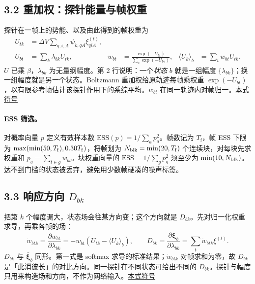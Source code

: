 \documentclass[UTF8,fontset=none,10pt,a4paper]{ctexart}
\newcommand{\X}{\bar{\bm\xi}}
\newcommand{\sd}[1]{\hfill\mbox{\footnotesize\hyperlink{sym:#1}{本式符号}}\par}
\begin{document}
\subsection*{3.2 重加权：探针能量与帧权重}
探针在一帧上的势能、以及由此得到的帧权重为
\begin{equation}\label{e:weight}
 \begin{aligned}
 U_{tk}&=\Delta V\sum_{q,i,A}\psi_{k,qA}\xi^{(t)}_{qiA},\\
 U_{bt}&=\sum_k\lambda_{bk}U_{tk},&
 w_{bt}&=\frac{\exp(-U_{bt})}{\sum_s\exp(-U_{bs})},&
 \langle U_k\rangle_b&=\sum_t w_{bt}U_{tk}.
 \end{aligned}
\end{equation}
$U$ 已乘 $\beta$，$\lambda_{bk}$ 为无量纲幅度。第 2 行说明：一个\emph{状态} $b$ 就是一组幅度 $\{\lambda_{bk}\}$；换一组幅度就是另一个状态。Boltzmann 重加权给原轨迹每帧乘权重 $\exp(-U_{bt})$，以有限参考帧估计该探针作用下的系综平均。$w_{bt}$ 在同一轨迹内对帧归一。\sd{e:weight}

\paragraph{ESS 筛选。} 对概率向量 $p$ 定义有效样本数 $\mathrm{ESS}(p)=1/\sum_a p_a^2$。帧数记为 $T_{\mathrm f}$，帧 ESS 下限为 $\max(\min(50,T_{\rm f}),0.30T_{\rm f})$，将帧划为 $N_{\rm blk}=\min(20,T_{\mathrm f})$ 个连续块，对每块先求权重和 $p_g=\sum_{t\in g}w_{bt}$。块权重向量的 $\mathrm{ESS}=1/\sum_g p_g^2$ 须至少为 $\min(10,N_{\rm blk})$。达不到门槛的状态被丢弃，避免用少数帧硬凑的噪声标签。

\subsection*{3.3 响应方向 $D_{bk}$}
把第 $k$ 个幅度调大，状态场会往某方向变；这个方向就是 $D_{bk}$。先对归一化权重求导，再乘各帧的场：
\begin{equation}\label{e:tangent}
 \dot w_{btk}=\frac{\partial w_{bt}}{\partial\lambda_{bk}}
      =-w_{bt}(U_{tk}-\langle U_k\rangle_b),\qquad
 D_{bk}=\frac{\partial\X_b}{\partial\lambda_{bk}}
      =\sum_t\dot w_{btk}\xi^{(t)}.
\end{equation}
$D_{bk}$ 与 $\X_b$ 同形。第一式是 softmax 求导的标准结果；$\dot w_{btk}$ 对帧求和为零，故 $D_{bk}$ 是「此消彼长」的对比方向。同一探针在不同状态可给出不同的 $D_{bk}$。探针与幅度只用来构造场和方向，不作为网络输入。\sd{e:tangent}
\end{document}
